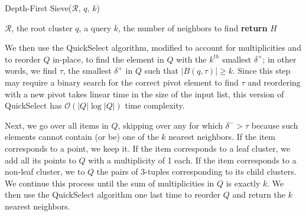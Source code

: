 \begin{minipage}{0.425\textwidth}
    \begin{algorithm}[H]\small
        \caption{Depth-First Sieve($\mathcal{R}$, $q$, $k$)}
        \label{alg:methods:depth-first-sieve}
        \begin{algorithmic}
            \Require $\mathcal{R}$, the root cluster
            \Require $q$, a query
            \Require $k$, the number of neighbors to find
                \EndWhile
                \EndFor
            \EndWhile
            \State \textbf{return} $H$
        \end{algorithmic}
    \end{algorithm}
\end{minipage}

\vskip 0.1in

We then use the QuickSelect algorithm, modified to account for multiplicities and to reorder $Q$ in-place, to find the element in $Q$ with the $k^{th}$ smallest $\delta^{+}$; in other words, we find $\tau$, the smallest $\delta^{+}$ in $Q$ such that $\left| B(q, \tau) \right| \geq k$.
Since this step may require a binary search for the correct pivot element to find $\tau$ and reordering with a new pivot takes linear time in the size of the input list, this version of QuickSelect has $\mathcal{O}\left(|Q| \log |Q|\right)$ time complexity.

Next, we go over all items in $Q$, skipping over any for which $\delta^{-} > \tau$ because such elements cannot contain (or be) one of the $k$ nearest neighbors.
If the item corresponds to a point, we keep it.
If the item corresponds to a leaf cluster, we add all its points to $Q$ with a multiplicity of 1 each.
If the item corresponds to a non-leaf cluster, we to $Q$ the pairs of 3-tuples corresponding to its child clusters.
We continue this process until the sum of multiplicities in $Q$ is exactly $k$.
We then use the QuickSelect algorithm one last time to reorder $Q$ and return the $k$ nearest neighbors.

